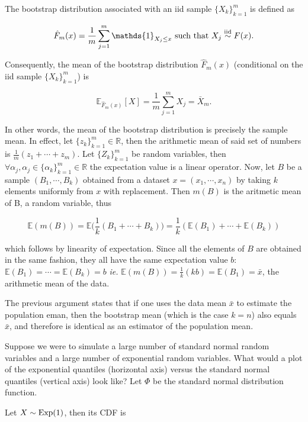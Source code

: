 \documentclass{homework}
\begin{document}
The bootstrap distribution associated with an iid sample $\{X_{k}\}_{k=1}^{m}$ is defined as 

$$
\hat{F}_{m}(x) = \frac{1}{m} \sum_{j=1}^{m} \mathds{1}_{X_j \leq x} \textnormal{ such that } X_j \overset{\textnormal{iid}}{\sim} F(x).
$$

Consequently, the mean of the bootstrap distribution $\hat{F}_{m}(x)$ (conditional on the iid sample $\{X_{k}\}_{k=1}^{m}$) is 

$$
\mathds{E}_{\hat{F}_{m}(x)}[X] = \frac{1}{m} \sum_{j=1}^{m} X_j = \bar{X}_m.
$$

In other words, the mean of the bootstrap distribution is precisely the sample mean. In effect, let $\{z_{k}\}_{k=1}^{m} \in \mathds{R}$, then the arithmetic mean of said set of numbers is $\frac{1}{m}(z_{1} + \cdots + z_m)$. Let $\{Z_k\}_{k=1}^{m}$ be random variables, then $\forall \alpha_{j}, \alpha_{j} \in  \{\alpha_{k}\}_{k=1}^{m} \in \mathds{R}$ the expectation value is a linear operator. Now, let $B$ be a sample $(B_1, \cdots, B_k)$ obtained from a dataset $x=(x_{1}, \cdots, x_n)$ by taking $k$ elements uniformly from $x$ with replacement. Then $m(B)$ is the aritmetic mean of B, a random variable, thus 

$$
\mathds{E}(m(B)) = \mathds{E}\bigg(\frac{1}{k}(B_1 + \cdots + B_k)\bigg) = \frac{1}{k} (\mathds{E}(B_1)+\cdots+\mathds{E}(B_k)) $$

which follows by linearity of expectation. Since all the elements of $B$ are obtained in the same fashion, they all have the same expectation value $b$: $\mathds{E}(B_1) = \cdots = \mathds{E}(B_k) = b$ \textit{ie. } $\mathds{E}(m(B)) = \frac{1}{k}(kb) = \mathds{E}(B_1) = \bar{x}$, the arithmetic mean of the data. 

The previous argument states that if one uses the data mean $\bar x$ to estimate the population eman, then the bootstrap mean (which is the case $k=n$) also equals $\bar x$, and therefore is identical as an estimator of the population mean. 

\begin{tcolorbox}[title=Question 9]
Suppose we were to simulate a large number of standard normal random variables and a large number of exponential random variables. What would a plot of the exponential quantiles (horizontal axis) versus the standard normal quantiles (vertical axis) look like? Let $\Phi$ be the standard normal distribution function.
\end{tcolorbox}

Let $X \sim \textnormal{Exp}(1)$, then its CDF is 
\end{document}
